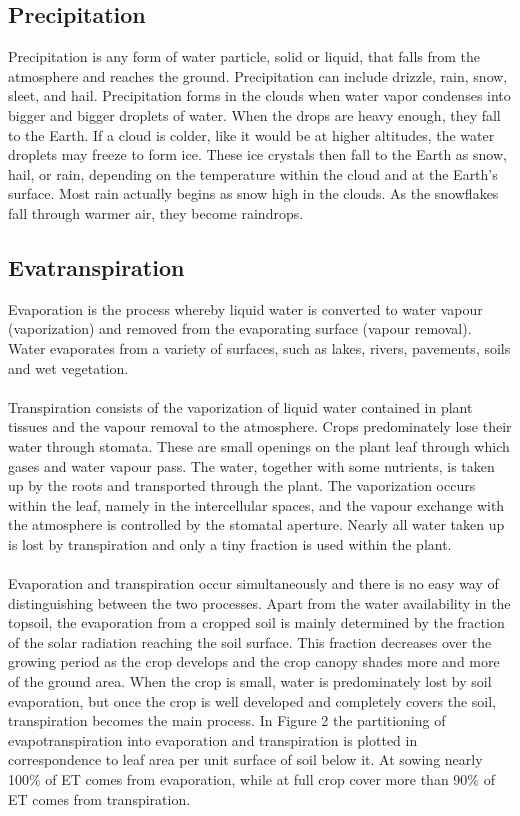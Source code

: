 \subsection{Precipitation}
Precipitation is any form of water particle, solid or liquid, that falls from the atmosphere and reaches the ground. Precipitation can include drizzle, rain, snow, sleet, and hail. Precipitation forms in the clouds when water vapor condenses into bigger and bigger droplets of water. When the drops are heavy enough, they fall to the Earth. If a cloud is colder, like it would be at higher altitudes, the water droplets may freeze to form ice. These ice crystals then fall to the Earth as snow, hail, or rain, depending on the temperature within the cloud and at the Earth's surface. Most rain actually begins as snow high in the clouds. As the snowflakes fall through warmer air, they become raindrops. 
\subsection{Evatranspiration}
Evaporation is the process whereby liquid water is converted to water vapour (vaporization) and removed from the evaporating surface (vapour removal). Water evaporates from a variety of surfaces, such as lakes, rivers, pavements, soils and wet vegetation.\\\\
Transpiration consists of the vaporization of liquid water contained in plant tissues and the vapour removal to the atmosphere. Crops predominately lose their water through stomata. These are small openings on the plant leaf through which gases and water vapour pass. The water, together with some nutrients, is taken up by the roots and transported through the plant. The vaporization occurs within the leaf, namely in the intercellular spaces, and the vapour exchange with the atmosphere is controlled by the stomatal aperture. Nearly all water taken up is lost by transpiration and only a tiny fraction is used within the plant.\\\\
Evaporation and transpiration occur simultaneously and there is no easy way of distinguishing between the two processes. Apart from the water availability in the topsoil, the evaporation from a cropped soil is mainly determined by the fraction of the solar radiation reaching the soil surface. This fraction decreases over the growing period as the crop develops and the crop canopy shades more and more of the ground area. When the crop is small, water is predominately lost by soil evaporation, but once the crop is well developed and completely covers the soil, transpiration becomes the main process. In Figure 2 the partitioning of evapotranspiration into evaporation and transpiration is plotted in correspondence to leaf area per unit surface of soil below it. At sowing nearly 100\% of ET comes from evaporation, while at full crop cover more than 90\% of ET comes from transpiration.\cite{allen1998crop}

